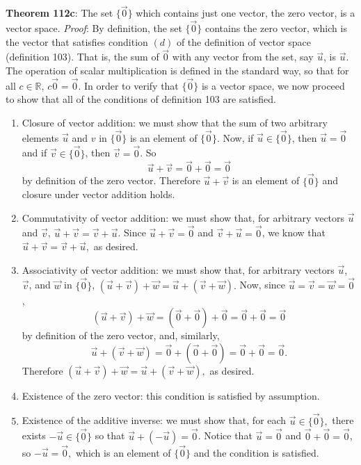 \documentclass{exam}
\begin{document}
\textbf{Theorem 112c}: The set $\{\Vec{0}\}$ which contains just one vector, the zero vector, is a vector space. \newline
\vspace{0.2in}
\newline
\textit{Proof}: By definition, the set $\{\Vec{0}\}$ contains the zero vector, which is the vector that satisfies condition $(d)$ of the definition of vector space (definition 103). That is, the sum of $\Vec{0}$ with any vector from the set, say $\Vec{u}$, is $\Vec{u}$. The operation of scalar multiplication is defined in the standard way, so that for all $c\in\mathbb{R}$, $c\Vec{0}=\Vec{0}$. In order to verify that $\{\Vec{0}\}$ is a vector space, we now proceed to show that all of the conditions of definition 103 are satisfied.

\begin{enumerate}[label=(\alph*)]
    \item Closure of vector addition: we must show that the sum of two arbitrary elements $\Vec{u}$ and $v$ in $\{\Vec{0}\}$ is an element of $\{\Vec{0}\}$. Now, if $\Vec{u}\in\{\Vec{0}\}$, then $\Vec{u}=\Vec{0}$ and if $\Vec{v}\in\{\Vec{0}\}$, then $\Vec{v}=\Vec{0}$. So
    $$\Vec{u}+\Vec{v}=\Vec{0}+\Vec{0}=\Vec{0}$$
   by definition of the zero vector. Therefore $\Vec{u}+\Vec{v}$ is an element of $\{\Vec{0}\}$ and closure under vector addition holds.
    
    \item Commutativity of vector addition: we must show that, for arbitrary vectors $\Vec{u}$ and $\Vec{v}$, $\Vec{u}+\Vec{v}=\Vec{v}+\Vec{u}$. Since $\Vec{u}+\Vec{v}=\Vec{0}$ and $\Vec{v}+\Vec{u}=\Vec{0}$, we know that $\Vec{u}+\Vec{v}=\Vec{v}+\Vec{u},$ as desired.
    
    \item Associativity of vector addition: we must show that, for arbitrary vectors $\Vec{u}$, $\Vec{v}$, and $\Vec{w}$ in $\{\Vec{0}\}$, $(\Vec{u}+\Vec{v})+\Vec{w}=\Vec{u}+(\Vec{v}+\Vec{w}).$ Now, since $\Vec{u}=\Vec{v}=\Vec{w}=\Vec{0}$, 
    $$(\Vec{u}+\Vec{v})+\Vec{w}=(\Vec{0}+\Vec{0})+\Vec{0}=\Vec{0}+\Vec{0}=\Vec{0}$$ by definition of the zero vector, and, similarly, $$\Vec{u}+(\Vec{v}+\Vec{w})=\Vec{0}+(\Vec{0}+\Vec{0})=\Vec{0}+\Vec{0}=\Vec{0}.$$ Therefore $(\Vec{u}+\Vec{v})+\Vec{w}=\Vec{u}+(\Vec{v}+\Vec{w}),$ as desired.
    
    \item Existence of the zero vector: this condition is satisfied by assumption. 
    
    \item Existence of the additive inverse: we must show that, for each $\Vec{u}\in\{\Vec{0}\},$ there exists $-\Vec{u}\in\{\Vec{0}\}$ so that $\Vec{u}+(-\Vec{u})=\Vec{0}$. Notice that $\Vec{u}=\Vec{0}$ and $\Vec{0}+\Vec{0}=\Vec{0}$, so $-\Vec{u}=\Vec{0},$ which is an element of $\{\Vec{0}\}$ and the condition is satisfied. 
    

\end{enumerate}
\end{document}
